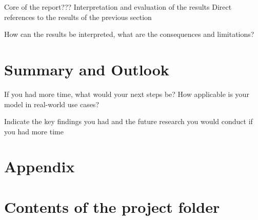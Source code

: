 \documentclass[12pt]{report}
\begin{document}
Core of the report???
Interpretation and evaluation of the results
Direct references to the results of the previous section

How can the results be interpreted, what are the consequences and
limitations?


\chapter{Summary and Outlook}
If you had more time, what would your next steps be? How applicable
is your model in real-world use cases?

Indicate the key findings you had and the future research you would
conduct if you had more time

\chapter{Appendix}
\printbibliography
\chapter{Contents of the project folder}
\end{document}
